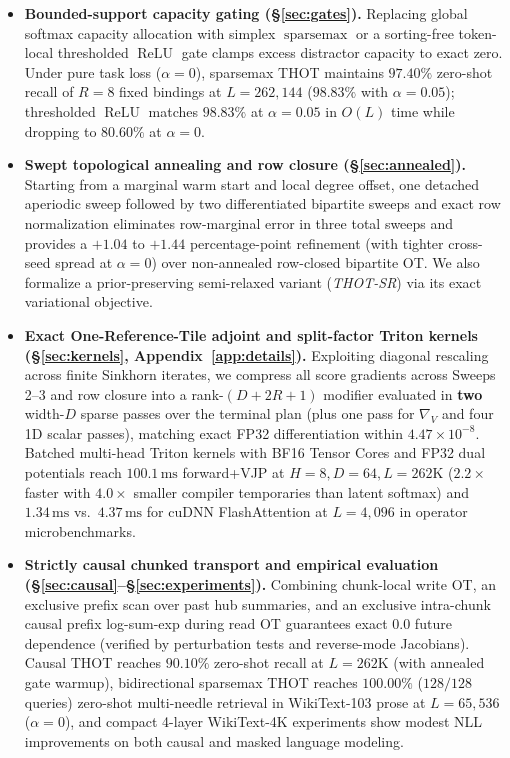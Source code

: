 \documentclass[11pt]{article}
\newcommand{\ReLU}{\operatorname{ReLU}}
\newcommand{\sparsemax}{\operatorname{sparsemax}}
\begin{document}
\begin{itemize}[leftmargin=1.5em]
  \item \textbf{Bounded-support capacity gating (\S\ref{sec:gates}).} Replacing global softmax capacity allocation with simplex $\sparsemax$ \citep{martins2016softmax,correia2019adaptively} or a sorting-free token-local thresholded $\ReLU$ gate \citep{wortsman2023replacing} clamps excess distractor capacity to exact zero. Under pure task loss ($\alpha=0$), sparsemax THOT maintains $97.40\%$ zero-shot recall of $R=8$ fixed bindings at $L=262{,}144$ ($98.83\%$ with $\alpha=0.05$); thresholded $\ReLU$ matches $98.83\%$ at $\alpha=0.05$ in $O(L)$ time while dropping to $80.60\%$ at $\alpha=0$.
  \item \textbf{Swept topological annealing and row closure (\S\ref{sec:annealed}).} Starting from a marginal warm start \citep{thornton2023initialization} and local degree offset, one detached aperiodic sweep followed by two differentiated bipartite sweeps and exact row normalization eliminates row-marginal error in three total sweeps and provides a $+1.04$ to $+1.44$ percentage-point refinement (with tighter cross-seed spread at $\alpha=0$) over non-annealed row-closed bipartite OT. We also formalize a prior-preserving semi-relaxed variant (\emph{THOT-SR}) via its exact variational objective.
  \item \textbf{Exact One-Reference-Tile adjoint and split-factor Triton kernels (\S\ref{sec:kernels}, Appendix~\ref{app:details}).} Exploiting diagonal rescaling across finite Sinkhorn iterates, we compress all score gradients across Sweeps 2--3 and row closure into a rank-$(D+2R+1)$ modifier evaluated in \textbf{two} width-$D$ sparse passes over the terminal plan (plus one pass for $\nabla_V$ and four 1D scalar passes), matching exact FP32 differentiation within $4.47\times 10^{-8}$. Batched multi-head Triton kernels \citep{triton2019tillet} with BF16 Tensor Cores and FP32 dual potentials reach $100.1\,\text{ms}$ forward+VJP at $H=8, D=64, L=262\text{K}$ ($2.2\times$ faster with $4.0\times$ smaller compiler temporaries than latent softmax) and $1.34\,\text{ms}$ vs.\ $4.37\,\text{ms}$ for cuDNN FlashAttention at $L=4{,}096$ in operator microbenchmarks.
  \item \textbf{Strictly causal chunked transport and empirical evaluation (\S\ref{sec:causal}--\S\ref{sec:experiments}).} Combining chunk-local write OT, an exclusive prefix scan over past hub summaries, and an exclusive intra-chunk causal prefix log-sum-exp during read OT guarantees exact $0.0$ future dependence (verified by perturbation tests and reverse-mode Jacobians). Causal THOT reaches $90.10\%$ zero-shot recall at $L=262\text{K}$ (with annealed gate warmup), bidirectional sparsemax THOT reaches $100.00\%$ ($128/128$ queries) zero-shot multi-needle retrieval in WikiText-103 prose at $L=65{,}536$ ($\alpha=0$), and compact 4-layer WikiText-4K experiments show modest NLL improvements on both causal and masked language modeling.
\end{itemize}
\end{document}

